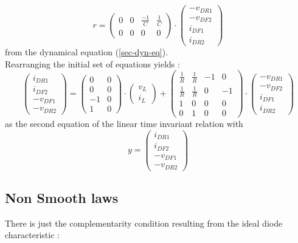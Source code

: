 \documentclass[10pt]{article}
\begin{document}
\[
r =
\left( \begin{array}{cccc}
0 & 0 & \frac{-1}{C} & \frac{1}{C}\\
0 & 0 & 0 & 0
\end{array} \right)
 \cdot
\left( \begin{array}{c}
-v_{DR1}\\
-v_{DF2}\\
i_{DF1}\\
i_{DR2}
\end{array} \right)
\]
from the dynamical equation (\ref{sec-dyn-eq}).\\
Rearranging the initial set of equations yields :
\[
\left( \begin{array}{c}
i_{DR1}\\
i_{DF2}\\
-v_{DF1}\\
-v_{DR2}
\end{array} \right)
 =
\left( \begin{array}{cc}
0 & 0\\
0 & 0\\
-1 & 0\\
1 & 0
\end{array} \right)
 \cdot
\left( \begin{array}{c}
v_L\\
i_L
\end{array} \right)
+
\left( \begin{array}{cccc}
\frac{1}{R} & \frac{1}{R} & -1 & 0\\
\frac{1}{R} & \frac{1}{R} & 0 & -1\\
1 & 0 & 0 & 0\\
0 & 1 & 0 & 0
\end{array} \right)
 \cdot
\left( \begin{array}{c}
-v_{DR1}\\
-v_{DF2}\\
i_{DF1}\\
i_{DR2}
\end{array} \right)
\]
as the second equation of the linear time invariant relation with
\[
y =
\left( \begin{array}{c}
i_{DR1}\\
i_{DF2}\\
-v_{DF1}\\
-v_{DR2}
\end{array} \right)
\]


\subsection{Non Smooth laws}
\label{Non Smooth laws}
There is just the complementarity condition resulting from the ideal diode characteristic :
\end{document}
